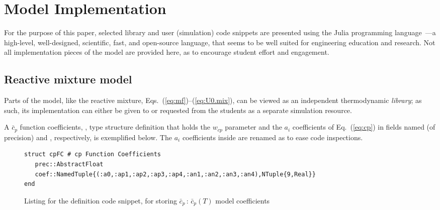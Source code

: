 
\section{Model Implementation}

    For the  purpose  of  this  paper,  selected  library  and  user  (simulation)  code  snippets  are  presented  using  the  Julia  programming  language~\cite{2012-BezansonJ+EdelmanA-CoRR,
    2017-BezansonJ+ShahVB-SIAMRev}---a high-level, well-designed, scientific, fast, and open-source language, that seems to be well suited for  engineering  education  and  research.  Not  all
    implementation pieces of the model are provided here, as to encourage student effort and engagement.

    \subsection{Reactive mixture model}

    Parts of the model, like the reactive mixture, Eqs.~(\ref{eq:mf})--(\ref{eq:U0.mix}), can be viewed as an independent thermodynamic \emph{library}; as such, its implementation  can  either
    be given to or requested from the students as a separate simulation resource.

    A $\bar{c}_p$ function coefficients, , type structure definition that holds the $w_{cp}$ parameter and the $a_i$ coefficients of Eq.~(\ref{eq:cp}) in  fields  named  
    (of precision) and , respectively, is exemplified below. The $a_i$ coefficients inside  are renamed as to ease code inspections.

    \begin{figure*}[ht]
        \centering
        \label{fig:code.cpFC}
        \begin{lstlisting}
struct cpFC # cp Function Coefficients
   prec::AbstractFloat
   coef::NamedTuple{(:a0,:ap1,:ap2,:ap3,:ap4,:an1,:an2,:an3,:an4),NTuple{9,Real}}
end
        \end{lstlisting}
        \caption{Listing for the  definition code snippet, for storing $\bar{c}_p\,:\,\bar{c}_p(T)$ model coefficients}
    \end{figure*}

